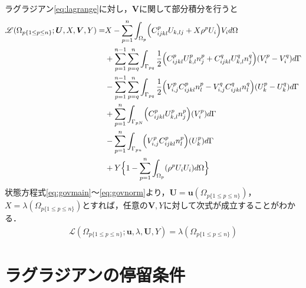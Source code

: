 ラグラジアン\eqref{eq:lagrange}に対し，$\bm{V}$に関して部分積分を行うと
\begin{align}
	\mathscr{L}(\Omega_{p\{1\leq p\leq n\}};\bm{U},X,\bm{V},Y)=&X-\sum_{p=1}^{n}\int_{\Omega_p}\Bigr(C_{ijkl}^{p}U_{k,lj}+X\rho^{p}U_{i}\Bigl)V_{i} d\Omega
	\nonumber
	\\
	&+\sum_{p=1}^{n-1}\sum_{p=q}^{n}\int_{\Gamma_{pq}}\frac{1}{2}\Bigr(C_{ijkl}^{p}U_{k,l}^{p}n_{j}^{p}+C_{ijkl}^{q}U_{k,l}^{q}n_{j}^{q}\Bigl)(V_{i}^{p}-V_{i}^{q}) d\Gamma
	\nonumber
	\\
	&-\sum_{p=1}^{n-1}\sum_{p=q}^{n}\int_{\Gamma_{pq}}\frac{1}{2}\Bigr(V_{i,j}^{p}C_{ijkl}^{p}n_{l}^{p}-V_{i,j}^{q}C_{ijkl}^{q}n_{l}^{q}\Bigl)(U_{k}^{p}-U_{k}^{q})d\Gamma
	\nonumber
	\\
	&+\sum_{p=1}^{n}\int_{\Gamma_{pN}}\Bigr(C_{ijkl}^{p}U_{k,l}^{p}n_{j}^{p}\Bigl)(V_{i}^{p}) d\Gamma
	\nonumber
	\\
	&-\sum_{p=1}^{n}\int_{\Gamma_{pu}}\Bigr(V_{i,j}^{p}C_{ijkl}^{p}n_{l}^{p}\Bigl)(U_{k}^{p}) d\Gamma
	\nonumber
	\\
	&+Y\Bigr\{1- \sum_{p=1}^{n}\int_{\Omega_{p}}(\rho^{p}U_{i}U_{i}) d\Omega \Bigl\}
	\nonumber
	\\
	\label{eq:lagrange_vint}
\end{align}
状態方程式\eqref{eq:govmain}～\eqref{eq:govnorm}より，$\bm{U}=\bm{u}(\Omega_{p\{1\leq p\leq n\}})$，
$X=\lambda(\Omega_{p\{1\leq p\leq n\}})$とすれば，任意の$\bm{V},Y$に対して次式が成立することがわかる．
\begin{align}
	\mathscr{L}(\Omega_{p\{1\leq p\leq n\}};\bm{u},\lambda,\bm{U},Y)=\lambda(\Omega_{p\{1\leq p\leq n\}})
	\label{eq:Lagrange_lambda}
\end{align}

\section{ラグラジアンの停留条件}


